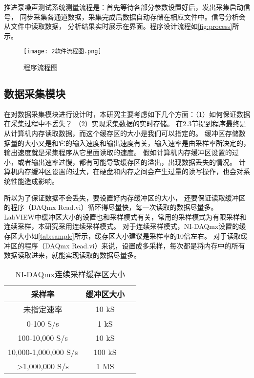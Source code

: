 推进泵噪声测试系统测量流程是：首先等待各部分参数设置好后，发出采集启动信号，
同步采集各通道数据，采集完成后数据自动存储在相应文件中。信号分析会从文件中读取数据，
分析结果实时展示在界面。程序设计流程如\autoref{fig:process}所示。
\begin{figure}[htbp]
    \centering
    \texttt{[image: 2软件流程图.png]}
    \caption{\label{fig:process}程序流程图}
\end{figure}

\begin{comment}
\subsection{系统设置模块}
软件界面的设置模块提供了测试系统各项参数设定，包括采集通道设置、采样参数设置、
传感器灵敏度设置、分析参数设置等。
\begin{figure}[htbp]
    \centering
    \texttt{[image: 2系统设置.png]}
    \caption{\label{fig:setting}系统设置}
\end{figure}
\end{comment}

\subsection{数据采集模块}
在对数据采集模块进行设计时，本研究主要考虑如下几个方面：（1）如何保证数据在采集过程中不丢失？
（2）实现采集数据的实时存储。
在2.3节提到程序最终是从计算机内存读取数据，而这个缓存区的大小是我们可以指定的。
缓冲区存储数据量的大小又是和它的输入速度和输出速度有关，输入速率是由采样率所决定的，
输出速度就是采集程序从它里面读取的速度。
假如计算机内存缓冲区设置的过小，或者输出速率过慢，都有可能导致缓存区的溢出，出现数据丢失的情况。
计算机内存缓冲区设置的过大，在硬盘和内存之间会产生过量的读写操作，也会对系统性能造成影响。

所以为了保证数据不会丢失，要设置好内存缓冲区的大小，
还要保证读取缓冲区的程序（DAQmx Read.vi）循环得尽量快，每一次读取的数据尽量多。
LabVIEW中缓冲区大小的设置也和采样模式有关，常用的采样模式为有限采样和连续采样，本研究采用连续采样模式。
对于连续采样模式，NI-DAQmx设置的缓存区大小如\autoref{tab:sample}所示，缓存区大小建议是采样率的10倍左右。
对于读取缓冲区的程序（DAQmx Read.vi）来说，设置成多采样，每次都是将内存中的所有数据读取进来，就能实现读取的数据尽量多。
\begin{table}[htbp]
    \centering
    \caption{\label{tab:sample}NI-DAQmx连续采样缓存区大小}
    \begin{tabular}{ccc}
     \toprule
     采样率&缓冲区大小\\
     \midrule
     未指定速率&10 kS\\
     0-100 S/s&1 kS\\
     100-10,000 S/s&10 kS\\
     10,000-1,000,000 S/s&100 kS\\
     >1,000,000 S/s&1 MS\\
     \bottomrule
    \end{tabular}
\end{table}

